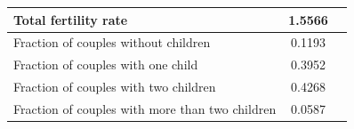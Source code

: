 \begin{tabular}{lcS}\toprule
    Total fertility rate                            &   1.5566  \\\midrule
    Fraction of couples without children            &   0.1193  \\
    Fraction of couples with one child              &   0.3952  \\
    Fraction of couples with two children           &   0.4268  \\
    Fraction of couples with more than two children &   0.0587  \\\bottomrule
\end{tabular}
